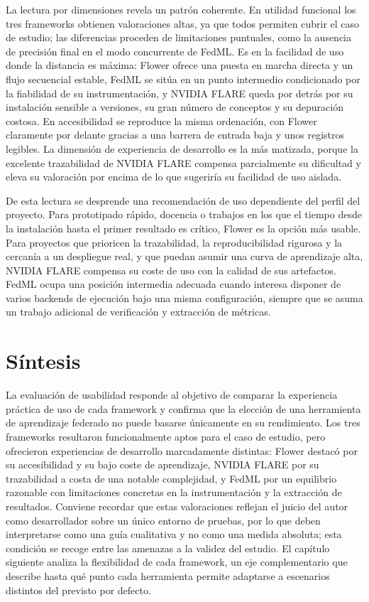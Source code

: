 La lectura por dimensiones revela un patrón coherente. En utilidad funcional los tres
frameworks obtienen valoraciones altas, ya que todos permiten cubrir el caso de estudio; las
diferencias proceden de limitaciones puntuales, como la ausencia de precisión final en el
modo concurrente de FedML. Es en la facilidad de uso donde la distancia es máxima: Flower
ofrece una puesta en marcha directa y un flujo secuencial estable, FedML se sitúa en un punto
intermedio condicionado por la fiabilidad de su instrumentación, y NVIDIA FLARE queda por
detrás por su instalación sensible a versiones, su gran número de conceptos y su depuración
costosa. En accesibilidad se reproduce la misma ordenación, con Flower claramente por delante
gracias a una barrera de entrada baja y unos registros legibles. La dimensión de experiencia
de desarrollo es la más matizada, porque la excelente trazabilidad de NVIDIA FLARE compensa
parcialmente su dificultad y eleva su valoración por encima de lo que sugeriría su facilidad
de uso aislada.

De esta lectura se desprende una recomendación de uso dependiente del perfil del proyecto.
Para prototipado rápido, docencia o trabajos en los que el tiempo desde la instalación hasta
el primer resultado es crítico, Flower es la opción más usable. Para proyectos que prioricen
la trazabilidad, la reproducibilidad rigurosa y la cercanía a un despliegue real, y que puedan
asumir una curva de aprendizaje alta, NVIDIA FLARE compensa su coste de uso con la calidad de
sus artefactos. FedML ocupa una posición intermedia adecuada cuando interesa disponer de
varios backends de ejecución bajo una misma configuración, siempre que se asuma un trabajo
adicional de verificación y extracción de métricas.

\section{Síntesis}\label{sec:usab-sintesis}

La evaluación de usabilidad responde al objetivo de comparar la experiencia práctica de uso
de cada framework y confirma que la elección de una herramienta de aprendizaje federado no
puede basarse únicamente en su rendimiento. Los tres frameworks resultaron funcionalmente
aptos para el caso de estudio, pero ofrecieron experiencias de desarrollo marcadamente
distintas: Flower destacó por su accesibilidad y su bajo coste de aprendizaje, NVIDIA FLARE
por su trazabilidad a costa de una notable complejidad, y FedML por un equilibrio razonable
con limitaciones concretas en la instrumentación y la extracción de resultados. Conviene
recordar que estas valoraciones reflejan el juicio del autor como desarrollador sobre un único
entorno de pruebas, por lo que deben interpretarse como una guía cualitativa y no como una
medida absoluta; esta condición se recoge entre las amenazas a la validez del estudio. El
capítulo siguiente analiza la flexibilidad de cada framework, un eje complementario que
describe hasta qué punto cada herramienta permite adaptarse a escenarios distintos del
previsto por defecto.